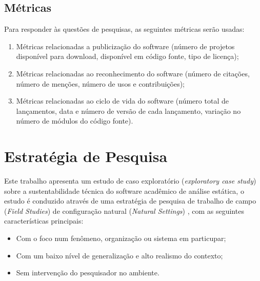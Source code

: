 \subsection{Métricas}

Para responder às questões de pesquisas, as seguintes métricas serão usadas:

\begin{enumerate}
  \item Métricas relacionadas a publicização do software (número de projetos
  disponível para download, disponível em código fonte, tipo de licença);

  \item Métricas relacionadas ao reconhecimento do software (número de
  citações, número de menções, número de usos e contribuições);

  \item Métricas relacionadas ao ciclo de vida do software (número total de
  lançamentos, data e número de versão de cada lançamento, variação no número
  de módulos do código fonte).
\end{enumerate}

\section{Estratégia de Pesquisa}

Este trabalho apresenta um estudo de caso exploratório ({\it exploratory case
study}) sobre a sustentabilidade técnica do software acadêmico de análise
estática, o estudo é conduzido através de uma estratégia de pesquisa de
trabalho de campo ({\it Field Studies}) de configuração natural ({\it Natural
Settings}) \cite{stol2015holistic}, com as seguintes características
principais:

\begin{itemize}
  \item Com o foco num fenômeno, organização ou sistema em particupar;
  \item Com um baixo nível de generalização e alto realismo do contexto;
  \item Sem intervenção do pesquisador no ambiente.
\end{itemize}


